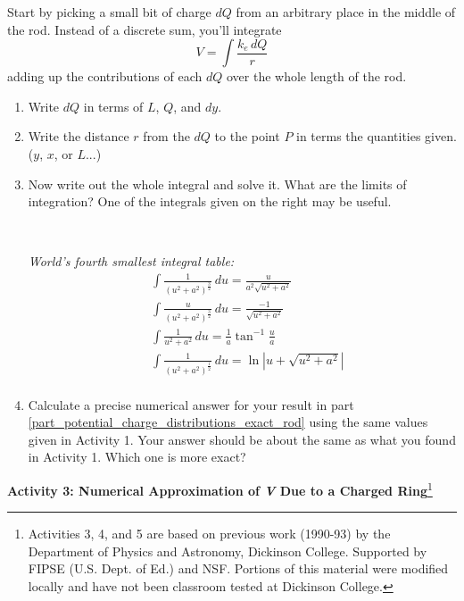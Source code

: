 Start by picking a small bit of charge $dQ$ from an arbitrary place in the middle of the rod.  Instead of a discrete sum, you'll integrate
$$V=\int{\frac{k_e\,dQ}{r}}$$
adding up the contributions of each $dQ$ over the whole length of the rod.
\begin{enumerate}[labparts]

\pagebreak[2]
\item Write $dQ$ in terms of $L$, $Q$, and $dy$.
\answerspace{0.3in}

\item Write the distance $r$ from the $dQ$ to the point $P$ in terms the quantities given.  ($y$, $x$, or $L$...) 
\answerspace{0.4in}

\item Now write out the whole integral and solve it.  What are the limits of integration?  One of the integrals given on the right may be useful. \label{part_potential_charge_distributions_exact_rod}

\begin{minipage}{0.65\textwidth}
\
\end{minipage}
\begin{minipage}{0.34\textwidth}

\textit{World's fourth smallest integral table:}
\begin{align*}
&\int \! \frac{1}{\left (u^2 + a^2 \right )^\frac{3}{2}} \, du=\frac{u}{a^2 \sqrt{u^2 + a^2}} \\
&\int \! \frac{u}{\left (u^2 + a^2 \right )^\frac{3}{2}} \, du=\frac{-1}{\sqrt{u^2 + a^2}} \\
&\int \! \frac{1}{u^2 + a^2} \, du=\frac{1}{a} \tan^{-1} \frac{u}{a} \\
&\int \! \frac{1}{\left (u^2 + a^2 \right )^\frac{1}{2}} \, du=\ln \left | u + \sqrt{u^2 + a^2} \right| \\
\end{align*}
\end{minipage}
\item Calculate a precise numerical answer for your result in part \ref{part_potential_charge_distributions_exact_rod} using the same values given in Activity 1.  Your answer should be about the same as what you found in Activity 1.  Which one is more exact?
\answerspace{0.4in}

\end{enumerate}

\textbf{Activity 3: Numerical Approximation of \textit{V} Due to a Charged Ring}\footnote{Activities 3, 4, and 5 are based on previous work (1990-93) by the Department of Physics and Astronomy, Dickinson College. Supported by FIPSE (U.S. Dept. of Ed.) and NSF. Portions of this material were modified locally and have not been classroom tested at Dickinson College.}

